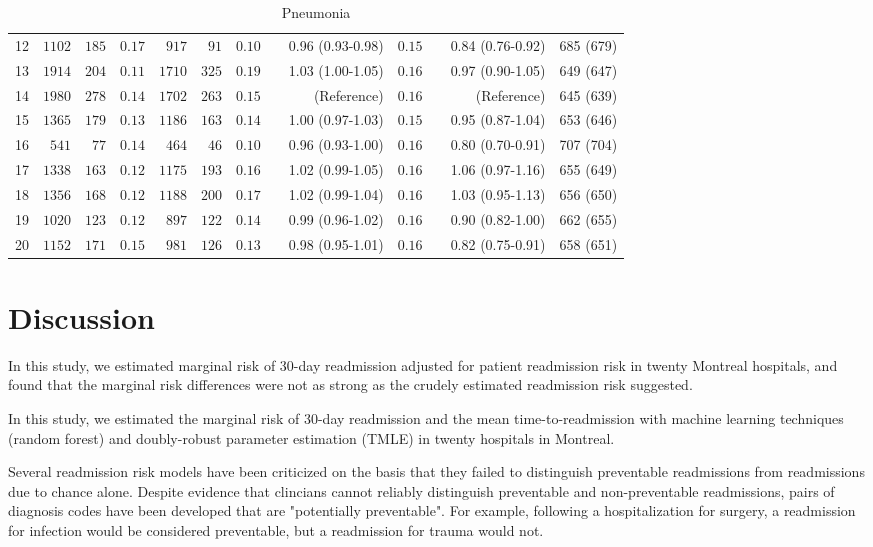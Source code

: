 \documentclass[]{article}\usepackage[]{graphicx}\usepackage[]{color}
\begin{document}
\begin{landscape}
\begin{table}[!tbp]
\begin{center}
\begin{tabular}{lrrrrrrcrrcrr}
12&$1102$&$185$&$0.17$&$ 917$&$ 91$&$0.10$&&0.96 (0.93-0.98)&$0.15$&&0.84 (0.76-0.92)&685 (679)\tabularnewline
13&$1914$&$204$&$0.11$&$1710$&$325$&$0.19$&&1.03 (1.00-1.05)&$0.16$&&0.97 (0.90-1.05)&649 (647)\tabularnewline
14&$1980$&$278$&$0.14$&$1702$&$263$&$0.15$&&(Reference)&$0.16$&&(Reference)&645 (639)\tabularnewline
15&$1365$&$179$&$0.13$&$1186$&$163$&$0.14$&&1.00 (0.97-1.03)&$0.15$&&0.95 (0.87-1.04)&653 (646)\tabularnewline
16&$ 541$&$ 77$&$0.14$&$ 464$&$ 46$&$0.10$&&0.96 (0.93-1.00)&$0.16$&&0.80 (0.70-0.91)&707 (704)\tabularnewline
17&$1338$&$163$&$0.12$&$1175$&$193$&$0.16$&&1.02 (0.99-1.05)&$0.16$&&1.06 (0.97-1.16)&655 (649)\tabularnewline
18&$1356$&$168$&$0.12$&$1188$&$200$&$0.17$&&1.02 (0.99-1.04)&$0.16$&&1.03 (0.95-1.13)&656 (650)\tabularnewline
19&$1020$&$123$&$0.12$&$ 897$&$122$&$0.14$&&0.99 (0.96-1.02)&$0.16$&&0.90 (0.82-1.00)&662 (655)\tabularnewline
20&$1152$&$171$&$0.15$&$ 981$&$126$&$0.13$&&0.98 (0.95-1.01)&$0.16$&&0.82 (0.75-0.91)&658 (651)\tabularnewline
\hline
\end{tabular}

\caption{Pneumonia\label{pneumonia_table}}\end{center}

\end{table}


\end{landscape}
\section{Discussion}
In this study, we estimated marginal risk of 30-day readmission adjusted for patient readmission risk in twenty Montreal hospitals, and found that the marginal risk differences were not as strong as the crudely estimated readmission risk suggested. 

In this study, we estimated the marginal risk of 30-day readmission and the mean time-to-readmission with machine learning techniques (random forest) and doubly-robust parameter estimation (TMLE) in twenty hospitals in Montreal.

Several readmission risk models have been criticized on the basis that they failed to distinguish preventable readmissions from readmissions due to chance alone. Despite evidence that clincians cannot reliably distinguish preventable and non-preventable readmissions, pairs of diagnosis codes have been developed that are "potentially preventable". For example, following a hospitalization for surgery, a readmission for infection would be considered preventable, but a readmission for trauma would not.
\end{document}
